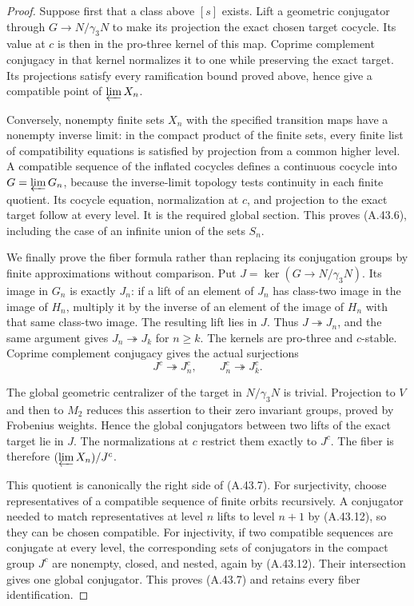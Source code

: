 \begin{proof}
Suppose first that a class above $[s]$ exists. Lift a
geometric conjugator through $G\to N/\gamma_3N$ to make
its projection the exact chosen target cocycle. Its
value at $c$ is then in the pro-three kernel of this
map. Coprime complement conjugacy in that kernel
normalizes it to one while preserving the exact target.
Its projections satisfy every ramification bound proved
above, hence give a compatible point of $\varprojlim X_n$.

Conversely, nonempty finite sets $X_n$ with the specified
transition maps have a nonempty inverse limit: in the
compact product of the finite sets, every finite list
of compatibility equations is satisfied by projection
from a common higher level. A compatible sequence of
the inflated cocycles defines a continuous cocycle into
$G=\varprojlim G_n$, because the inverse-limit topology
tests continuity in each finite quotient. Its cocycle
equation, normalization at $c$, and projection to the
exact target follow at every level. It is the required
global section. This proves (A.43.6), including the
case of an infinite union of the sets $S_n$.

We finally prove the fiber formula rather than replacing
its conjugation groups by finite approximations without
comparison. Put $J=\ker(G\to N/\gamma_3N)$. Its image in
$G_n$ is exactly $J_n$: if a lift of an element of $J_n$
has class-two image in the image of $H_n$, multiply it
by the inverse of an element of the image of $H_n$ with that same
class-two image. The resulting lift lies in $J$.
Thus $J\twoheadrightarrow J_n$, and the same argument
gives $J_n\twoheadrightarrow J_k$ for $n\ge k$.
The kernels are pro-three and $c$-stable. Coprime
complement conjugacy gives the actual surjections
\[
               J^c\twoheadrightarrow J_n^c,
       \qquad J_n^c\twoheadrightarrow J_k^c.
 \tag{A.43.12}
\]

The global geometric centralizer of the target in
$N/\gamma_3N$ is trivial. Projection to $V$ and then
to $M_2$ reduces this assertion to their zero invariant
groups, proved by Frobenius weights. Hence the global
conjugators between two lifts of the exact target lie
in $J$. The normalizations at $c$ restrict them exactly
to $J^c$. The fiber is therefore
$(\varprojlim X_n)/J^c$.

This quotient is canonically the right side of (A.43.7).
For surjectivity, choose representatives of a compatible
sequence of finite orbits recursively. A conjugator
needed to match representatives at level $n$ lifts to
level $n+1$ by (A.43.12), so they can be chosen compatible.
For injectivity, if two compatible sequences are
conjugate at every level, the corresponding sets of
conjugators in the compact group $J^c$ are nonempty,
closed, and nested, again by (A.43.12). Their intersection
gives one global conjugator. This proves (A.43.7) and
retains every fiber identification.


\end{proof}
